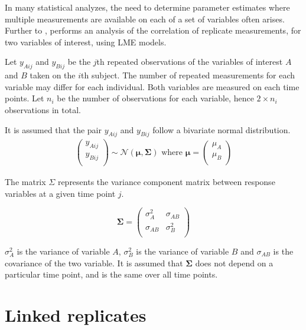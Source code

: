 \documentclass[12pt, a4paper]{report}
\theoremstyle{plain}
\theoremstyle{definition}
\theoremstyle{remark}
\begin{document}
	In many statistical analyzes, the need to determine parameter estimates where multiple measurements are available on each of a set of variables often arises. Further to \citet{lam}, \citet{hamlett} performs an analysis of the correlation of replicate measurements, for two variables of interest, using LME models.
	
	Let $y_{Aij}$ and $y_{Bij}$ be the $j$th repeated observations of the variables of interest $A$ and $B$ taken on the $i$th subject. The number of repeated measurements for each variable may differ for each individual.
	Both variables are measured on each time points. Let $n_{i}$ be the number of observations for each variable, hence $2\times n_{i}$ observations in total.
	
	It is assumed that the pair $y_{Aij}$ and $y_{Bij}$ follow a bivariate normal distribution.
	\begin{eqnarray*}
		\left(
		\begin{array}{c}
			y_{Aij} \\
			y_{Bij} \\
		\end{array}
		\right) \sim \mathcal{N}(
		\boldsymbol{\mu}, \boldsymbol{\Sigma})\mbox{   where } \boldsymbol{\mu} = \left(
		\begin{array}{c}
			\mu_{A} \\
			\mu_{B} \\
		\end{array}
		\right)
	\end{eqnarray*}
	
	The matrix $\Sigma$ represents the variance component matrix between response variables at a given time point $j$.
	
	\[
	\boldsymbol{\Sigma} = \left( \begin{array}{cc}
	\sigma^2_{A} & \sigma_{AB} \\
	\sigma_{AB} & \sigma^2_{B}\\
	\end{array}   \right)
	\]
	
	$\sigma^2_{A}$ is the variance of variable $A$, $\sigma^2_{B}$ is the variance of variable $B$ and $\sigma_{AB}$ is the covariance of the two variable. It is assumed that $\boldsymbol{\Sigma}$ does not depend on a particular time point, and is the same over all time points.
	
	
	
	\section{Linked replicates}
	
\end{document}
